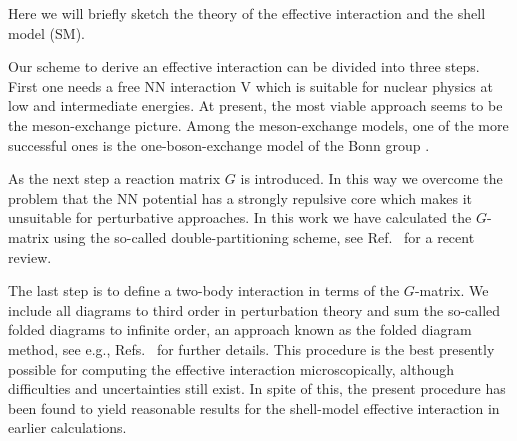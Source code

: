 Here we will briefly sketch the theory of the effective interaction and
the shell model (SM).

Our scheme to derive an effective interaction can be divided into three
steps. First one needs a free NN interaction V which is suitable
for nuclear physics at low and intermediate energies. At present, the
most viable approach seems to be the meson-exchange picture. Among the
meson-exchange models, one of the more successful ones is the 
one-boson-exchange model of the Bonn group \cite{MAC89}.

As the next step a reaction matrix $G$ is introduced. In this way we 
overcome the problem that the NN potential has a strongly 
repulsive core which makes 
it unsuitable for perturbative approaches. In this work we have calculated
the $G$-matrix using the so-called double-partitioning scheme, see 
Ref.\  \cite{HJO95} for a recent review.

The last step is to define a two-body interaction in terms of the $G$-matrix.
We include all diagrams to third order in perturbation theory and sum the
so-called folded diagrams to infinite order, an approach known as the folded 
diagram method, see e.g., Refs.\ \cite{HOL97,HJO95} for further details.
This procedure is the best presently possible for computing the effective
interaction microscopically, although difficulties and uncertainties still
exist. In spite of this, the present procedure has been found to yield
reasonable results for the shell-model effective interaction in
earlier calculations.

